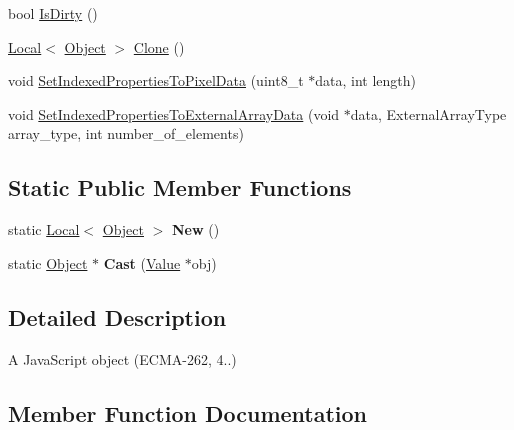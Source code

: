 \begin{DoxyCompactItemize}
\item 
bool \hyperlink{classv8_1_1_object_a3c1f8cfb754b5d29d5f1998b2047befd}{Is\+Dirty} ()
\item 
\hyperlink{classv8_1_1_local}{Local}$<$ \hyperlink{classv8_1_1_object}{Object} $>$ \hyperlink{classv8_1_1_object_a5018c9d085aa71f65530cf1e073a04ad}{Clone} ()
\item 
void \hyperlink{classv8_1_1_object_a6c552c4817b9a0eff1fb12b7ef089026}{Set\+Indexed\+Properties\+To\+Pixel\+Data} (uint8\+\_\+t $\ast$data, int length)
\item 
void \hyperlink{classv8_1_1_object_a530f661dec20ce1a0a1b15a45195418c}{Set\+Indexed\+Properties\+To\+External\+Array\+Data} (void $\ast$data, External\+Array\+Type array\+\_\+type, int number\+\_\+of\+\_\+elements)
\end{DoxyCompactItemize}
\subsection*{Static Public Member Functions}
\begin{DoxyCompactItemize}
\item 
\hypertarget{classv8_1_1_object_a4360445f2166250431502b82242ba873}{}static \hyperlink{classv8_1_1_local}{Local}$<$ \hyperlink{classv8_1_1_object}{Object} $>$ {\bfseries New} ()\label{classv8_1_1_object_a4360445f2166250431502b82242ba873}

\item 
\hypertarget{classv8_1_1_object_a1f9ac46d0b164197318ce81dc0ec1343}{}static \hyperlink{classv8_1_1_object}{Object} $\ast$ {\bfseries Cast} (\hyperlink{classv8_1_1_value}{Value} $\ast$obj)\label{classv8_1_1_object_a1f9ac46d0b164197318ce81dc0ec1343}

\end{DoxyCompactItemize}


\subsection{Detailed Description}
A Java\+Script object (E\+C\+M\+A-\/262, 4..) 

\subsection{Member Function Documentation}
\hypertarget{classv8_1_1_object_a5018c9d085aa71f65530cf1e073a04ad}{}
